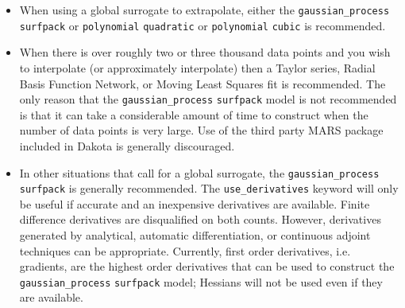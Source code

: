 \begin{itemize}
\item When using a global surrogate to extrapolate, either the
      \texttt{gaussian\_process} \texttt{surfpack} or 
      \texttt{polynomial} \texttt{quadratic} or 
      \texttt{polynomial} \texttt{cubic} is recommended.
\item When there is over roughly two or three thousand data points 
      and you wish to interpolate (or approximately interpolate) then 
      a Taylor series, Radial Basis Function Network, or Moving Least
      Squares fit is recommended.  The only reason that the 
      \texttt{gaussian\_process} \texttt{surfpack} model is not 
      recommended is that it can take a considerable amount of time
      to construct when the number of data points is very large.  Use 
      of the third party MARS package included in Dakota is generally 
      discouraged.
\item In other situations that call for a global surrogate, the 
      \texttt{gaussian\_process} \texttt{surfpack} is generally 
      recommended.  The \texttt{use\_derivatives} keyword will 
      only be useful if accurate and an inexpensive derivatives 
      are available. Finite difference derivatives are disqualified 
      on both counts.  However, derivatives generated by analytical,
      automatic differentiation, or continuous adjoint techniques
      can be appropriate.  Currently, first order derivatives, i.e.
      gradients, are the highest order derivatives that can be used
      to construct the \texttt{gaussian\_process} \texttt{surfpack}
      model; Hessians will not be used even if they are available.
\end{itemize}
      